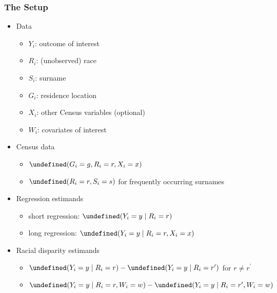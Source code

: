 \documentclass{beamer}
\let\Pr\undefined
\DeclareMathOperator{\Pr}{\mathbb{P}}
\begin{document}
\begin{frame}

\frametitle{The Setup}

\begin{itemize}
\item<1-> Data
  \begin{itemize}
  \item<1-> $Y_i$: outcome of interest 
  \item<1-> $R_i$: (unobserved) race
  \item<1-> $S_i$: surname
  \item<1-> $G_i$: residence location
  \item<1-> $X_i$: other Census variables (optional)
  \item<1-> $W_i$: covariates of interest
  \end{itemize}
\item<2-> Census data
  \begin{itemize}
  \item<2-> $\Pr(G_i = g, R_i = r, X_i = x)$
  \item<2-> $\Pr(R_i = r, S_i =s)$ for frequently occurring surnames
  \end{itemize}

  \vfill
\item<3-> Regression estimands
  \begin{itemize}
  \item<3-> short regression: $\Pr(Y_i = y \mid R_i = r)$
  \item<3-> long regression: $\Pr(Y_i = y \mid R_i = r, X_i =x)$
  \end{itemize}

\item<4-> Racial disparity estimands
  \begin{itemize}
  \item<4-> $\Pr(Y_i =y \mid R_i = r) - \Pr(Y_i = y \mid R_i = r^\prime)$ for $r
    \ne r^\prime$
  \item<4-> $\Pr(Y_i = y \mid R_i = r, W_i = w) - \Pr(Y_i = y \mid R_i = r^\prime, W_i = w)$
  \end{itemize}
\vspace{-.25in}
\end{itemize}
  
\end{frame}
\end{document}

